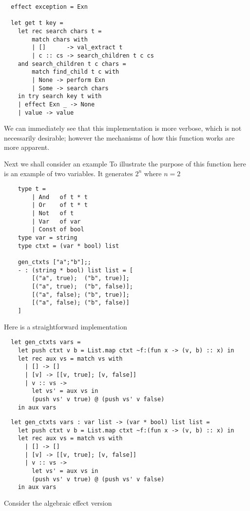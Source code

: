 \begin{verbatim}
  effect exception = Exn

  let get t key =
    let rec search chars t =
        match chars with
        | []      -> val_extract t
        | c :: cs -> search_children t c cs
    and search_children t c chars =
        match find_child t c with
        | None -> perform Exn
        | Some -> search chars
    in try search key t with
    | effect Exn _ -> None
    | value -> value
\end{verbatim}

We can immediately see that this implementation is more verbose,
which is not necessarily desirable;
however the mechanisms of how this function works
are more apparent.

Next we shall consider an example
To illustrate the purpose of this function here
is an example of two variables.
It generates $2^n$ where $n = 2$

\begin{verbatim}
    type t =
        | And   of t * t
        | Or    of t * t
        | Not   of t
        | Var   of var
        | Const of bool
    type var = string
    type ctxt = (var * bool) list

    gen_ctxts ["a";"b"];;
    - : (string * bool) list list = [
        [("a", true);  ("b", true)];
        [("a", true);  ("b", false)];
        [("a", false); ("b", true)];
        [("a", false); ("b", false)]
    ]
\end{verbatim}

Here is a straightforward implementation
\begin{verbatim}
  let gen_ctxts vars =
    let push ctxt v b = List.map ctxt ~f:(fun x -> (v, b) :: x) in
    let rec aux vs = match vs with
      | [] -> []
      | [v] -> [[v, true]; [v, false]]
      | v :: vs ->
        let vs' = aux vs in
        (push vs' v true) @ (push vs' v false)
    in aux vars
\end{verbatim}

\begin{verbatim}
  let gen_ctxts vars : var list -> (var * bool) list list =
    let push ctxt v b = List.map ctxt ~f:(fun x -> (v, b) :: x) in
    let rec aux vs = match vs with
      | [] -> []
      | [v] -> [[v, true]; [v, false]]
      | v :: vs ->
        let vs' = aux vs in
        (push vs' v true) @ (push vs' v false)
    in aux vars
\end{verbatim}
Consider the algebraic effect version

